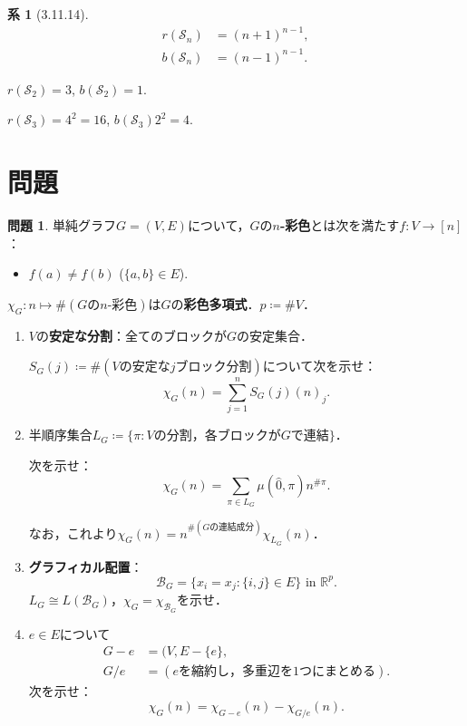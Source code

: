 \documentclass[xelatex,ja=standard,a4paper,14pt,everyparhook=compat]{bxjsarticle}
\newcommand{\bbR}{\mathbb{R}}
\newcommand{\mcB}{\mathcal{B}}
\newcommand{\mcS}{\mathcal{S}}
\theoremstyle{definition}
\newtheorem*{corollary}{系}
\newtheorem{problem}{問題}
\begin{document}
\begin{corollary}[3.11.14]
    \begin{align*}
        r(\mcS_n) & = (n+1)^{n-1}, \\
        b(\mcS_n) & = (n-1)^{n-1}.
    \end{align*}
\end{corollary}

$r(\mcS_2) = 3$, $b(\mcS_2) = 1$.

$r(\mcS_3) = 4^2 = 16$, $b(\mcS_3) 2^2 = 4$.

\section{問題}

\setcounter{problem}{107}
\begin{problem}
単純グラフ$G = (V,E)$について，$G$の\textbf{$n$-彩色}とは次を満たす$f: V \to [n]$： \begin{itemize}
    \item $f(a) \neq f(b)$ ($\{a,b\} \in E$).
\end{itemize}
$\chi_G: n \mapsto \#(\text{$G$の$n$-彩色})$は$G$の\textbf{彩色多項式}．$p \coloneqq \#V$．

\begin{enumerate}[label=\alph*.]
    \item $V$の\textbf{安定な分割}：全てのブロックが$G$の安定集合．

          $S_G(j) \coloneqq \#(\text{$V$の安定な$j$ブロック分割})$について次を示せ： \begin{equation*}
              \chi_G(n) = \sum_{j=1}^n S_G(j) (n)_j.
          \end{equation*}
    \item 半順序集合$L_G \coloneqq \{\pi : \text{$V$の分割，各ブロックが$G$で連結}\}$．

          次を示せ： \begin{equation*}
              \chi_G(n) = \sum_{\pi \in L_G} \mu(\hat0, \pi) n^{\#\pi}.
          \end{equation*}

          なお，これより$\chi_G(n) = n^{\#(\text{$G$の連結成分})} \chi_{L_G}(n)$．
    \item \textbf{グラフィカル配置}： \begin{equation*}
        \mcB_G = \text{$\{x_i = x_j : \{i,j\} \in E\}$ in $\bbR^p$}.
    \end{equation*}
    $L_G \cong L(\mcB_G)$，$\chi_G = \chi_{\mcB_G}$を示せ．
    \item $e \in E$について \begin{align*}
        G - e &= (V, E - \{e\}, \\
        G/e &= (\text{$e$を縮約し，多重辺を$1$つにまとめる}).
    \end{align*}
    次を示せ： \begin{equation*}
        \chi_G(n) = \chi_{G-e}(n) - \chi_{G/e}(n).
    \end{equation*}
\end{enumerate}
\end{problem}
\end{document}
